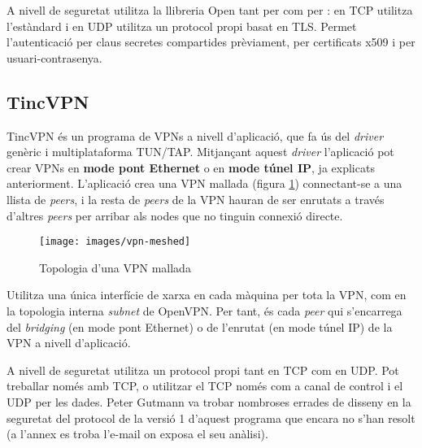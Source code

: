 A nivell de seguretat utilitza la llibreria Open tant per  com per : en TCP utilitza l'estàndard  i en UDP utilitza un protocol propi basat en TLS. Permet l'autenticació per claus secretes compartides prèviament, per certificats x509 i per usuari-contrasenya.

\subsection{TincVPN}
TincVPN és un programa de VPNs a nivell d'aplicació, que fa ús del \emph{driver} genèric i multiplataforma TUN/TAP. Mitjançant aquest \emph{driver} l'aplicació pot crear VPNs en \textbf{mode pont Ethernet} o en \textbf{mode túnel IP}, ja explicats anteriorment. L'aplicació crea una VPN mallada (figura \ref{F:vpn-meshed}) connectant-se a una llista de \emph{peers}, i la resta de \emph{peers} de la VPN hauran de ser enrutats a través d'altres \emph{peers} per arribar als nodes que no tinguin connexió directe.
\begin{figure}[htb]
\centering
\texttt{[image: images/vpn-meshed]}
\caption{Topologia d'una VPN mallada}
\label{F:vpn-meshed}
\end{figure}

Utilitza una única interfície de xarxa en cada màquina per tota la VPN, com en la topologia interna \emph{subnet} de OpenVPN. Per tant, és cada \emph{peer} qui s'encarrega del \emph{bridging} (en mode pont Ethernet) o de l'enrutat (en mode túnel IP) de la VPN a nivell d'aplicació.

A nivell de seguretat utilitza un protocol propi tant en TCP com en UDP. Pot treballar només amb TCP, o utilitzar el TCP només com a canal de control i el UDP per les dades. Peter Gutmann va trobar nombroses errades de disseny en la seguretat del protocol de la versió 1 d'aquest programa que encara no s'han resolt (a l'annex  es troba l'e-mail on exposa el seu anàlisi).

